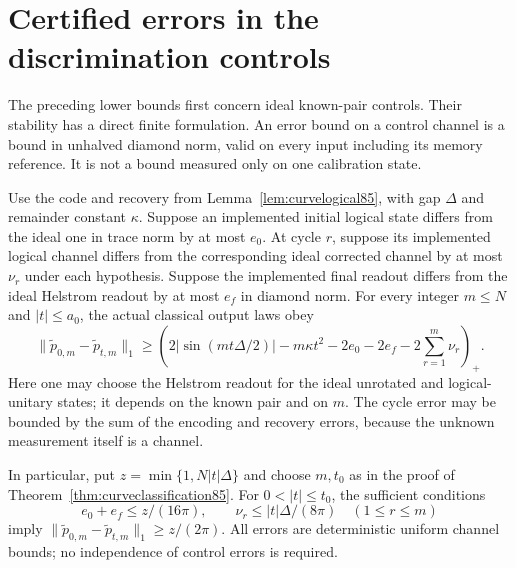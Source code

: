 \section{Certified errors in the discrimination controls}
\label{sec:controlstability85}
The preceding lower bounds first concern ideal known-pair controls.
Their stability has a direct finite formulation.  An error bound on a
control channel is a bound in unhalved diamond norm, valid on every
input including its memory reference.  It is not a bound measured only
on one calibration state.

\begin{theorem}\label{thm:controlstability85}
Use the code and recovery from Lemma~\ref{lem:curvelogical85}, with
gap $\Delta$ and remainder constant $\kappa$.
Suppose an implemented initial logical state differs from the ideal
one in trace norm by at most $e_0$.  At cycle $r$, suppose its
implemented logical channel differs from the corresponding ideal
corrected channel by at most $\nu_r$ under each hypothesis.
Suppose the implemented final readout differs from the ideal
Helstrom readout by at most $e_f$ in diamond norm.
For every integer $m\le N$ and $|t|\le a_0$, the actual classical
output laws obey
\begin{equation}\label{eq:controlledger85}
 \|\widetilde p_{0,m}-\widetilde p_{t,m}\|_1
 \ge\left(2|\sin(mt\Delta/2)|-m\kappa t^2
              -2e_0-2e_f-2\sum_{r=1}^m\nu_r\right)_+.
\end{equation}
Here one may choose the Helstrom readout for the ideal unrotated and
logical-unitary states; it depends on the known pair and on $m$.
The cycle error may be bounded by the sum of the encoding and recovery
errors, because the unknown measurement itself is a channel.

In particular, put $z=\min\{1,N|t|\Delta\}$ and choose $m,t_0$
as in the proof of Theorem~\ref{thm:curveclassification85}.
For $0<|t|\le t_0$, the sufficient conditions
\begin{equation}\label{eq:controlprecision85}
 e_0+e_f\le z/(16\pi),\qquad
 \nu_r\le |t|\Delta/(8\pi)\quad(1\le r\le m)
\end{equation}
imply
$\|\widetilde p_{0,m}-\widetilde p_{t,m}\|_1\ge z/(2\pi)$.
All errors are deterministic uniform channel bounds; no independence
of control errors is required.
\end{theorem}
